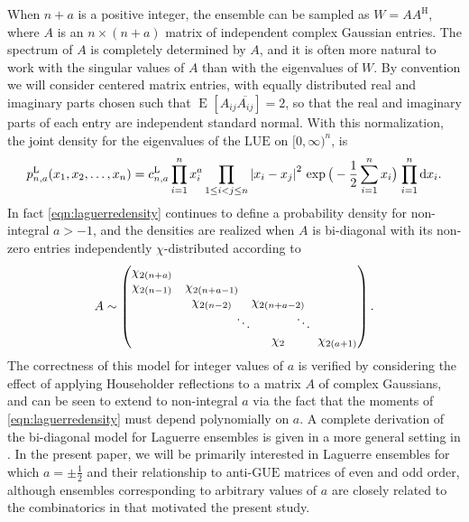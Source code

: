 \documentclass[pdftex, oneside, 10pt, letterpaper]{amsart}
\theoremstyle{plain}
\theoremstyle{definition}
\theoremstyle{remark}
\begin{document}
When $n+a$ is a positive integer, the ensemble can be sampled as
$W=AA^{\mathrm{H}}$, where $A$ is an $n\times{}(n+a)$ matrix of independent
complex Gaussian entries.  The spectrum of $A$ is completely
determined by $A$, and it is often more natural to work with the
singular values of $A$ than with the eigenvalues of $W$.  By
convention we will consider centered matrix entries, with equally
distributed real and imaginary parts chosen such that
${\operatorname{E}_{}\left[{A_{ij}\overline{A_{ij}}}\right]}=2$, so that the real and imaginary parts
of each entry are independent standard normal.  With this
normalization, the joint density for the eigenvalues of the {\ensuremath{\mathrm{LUE}}}{} on
$[0,\infty)^n$, is
\begin{equation}\label{eqn:laguerredensity}
p_{n,a}^{\mathrm{L}}(x_1,x_2,\dotsc,x_n)=
c_{n,a}^{\mathrm{L}}  \prod_{i=1}^{n}{x_i^{a}
  \prod_{1\leq i<j\leq n}{{\ifx\relax{}\relax\else\fi}{{}}\lvert{x_i-x_j}{{}}\rvert}^2}\,
  \exp\big(-\frac{1}{2}\sum_{i=1}^n x_i\big)
  {\;\prod_{i={1}}^{{n}} \mathrm{d}{{x}}_i}.
\end{equation}
In fact \eqref{eqn:laguerredensity} continues to define a probability
density for non-integral $a>-1$, and the densities are
realized when $A$ is bi-diagonal with its non-zero entries
independently $\chi$-distributed according to
\begin{equation}\label{eqn:bi-diagonalform}
  A\sim\begin{pmatrix} \chi_{2(n+a)} \\ \chi_{2(n-1)} &
  \chi_{2(n+a-1)} \\ & \chi_{2(n-2)} & \chi_{2(n+a-2)} \\ 
  & \makebox[0pt]{\hspace*{5em}$\ddots$} & \makebox[0pt]{\hspace*{4em}$\ddots$} \\ 
  & & \chi_2 & \chi_{2(a+1)}
  \end{pmatrix}.
\end{equation}
The correctness of this model for integer values of $a$ is verified by
considering the effect of applying Householder reflections to a matrix
$A$ of complex Gaussians, and can be seen to extend to non-integral
$a$ via the fact that the moments of \eqref{eqn:laguerredensity} must
depend polynomially on $a$.  A complete derivation of the bi-diagonal
model for Laguerre ensembles is given in a more general setting in
\cite{DuEd}.  In the present paper, we will be primarily interested in
Laguerre ensembles for which $a=\pm\frac12$ and their relationship to
anti-{\ensuremath{\mathrm{GUE}}}{} matrices of even and odd order, although ensembles
corresponding to arbitrary values of $a$ are closely related to the
combinatorics in \cite{JV-Eulerian} that motivated the present study.
\end{document}
